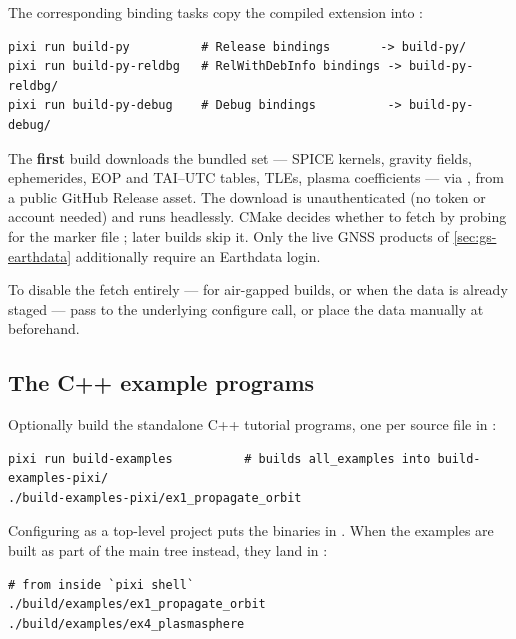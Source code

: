 The corresponding binding tasks copy the compiled extension into
:

\begin{lstlisting}[language=shell]
pixi run build-py          # Release bindings       -> build-py/
pixi run build-py-reldbg   # RelWithDebInfo bindings -> build-py-reldbg/
pixi run build-py-debug    # Debug bindings          -> build-py-debug/
\end{lstlisting}

\begin{lupntnote}
The \textbf{first} build downloads the bundled  set ---
SPICE kernels, gravity fields, ephemerides, EOP and TAI--UTC tables, TLEs,
plasma coefficients --- via , from a public
GitHub Release asset. The download is unauthenticated (no token or account
needed) and runs headlessly. CMake decides whether to fetch by probing for the
marker file ; later builds skip it. Only
the live GNSS products of \cref{sec:gs-earthdata} additionally require an
Earthdata login.

To disable the fetch entirely --- for air-gapped builds, or when the data is
already staged --- pass  to the underlying
 configure call, or place the data manually at
 beforehand.
\end{lupntnote}

\subsection{The C++ example programs}
\label{sec:gs-examples}

Optionally build the standalone C++ tutorial programs, one per source file in
:

\begin{lstlisting}[language=shell]
pixi run build-examples          # builds all_examples into build-examples-pixi/
./build-examples-pixi/ex1_propagate_orbit
\end{lstlisting}

Configuring  as a top-level project puts the binaries in
. When the examples are built as part of the main
 tree instead, they land in :

\begin{lstlisting}[language=shell]
# from inside `pixi shell`
./build/examples/ex1_propagate_orbit
./build/examples/ex4_plasmasphere
\end{lstlisting}

